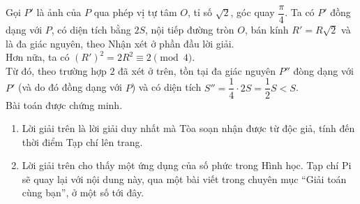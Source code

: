 \begin{bt}
{\begin{itemize}
			Gọi $P'$ là ảnh của $P$ qua phép vị tự tâm $O$, tỉ số $\sqrt{2}$, góc quay $\dfrac{\pi}{4}$. Ta có $P'$ đồng dạng với $P$, có diện tích bằng $2S$, nội tiếp đường tròn $O$, bán kính $R'=R\sqrt{2}$ và là đa giác nguyên, theo Nhận xét ở phần đầu lời giải.\\
			Hơn nữa, ta có $(R')^2=2R^2\equiv 2\pmod{4}$.\\
			Từ đó, theo trường hợp $2$ đã xét ở trên, tồn tại đa giác nguyên $P''$ đòng dạng với $P'$ (và do đó đồng dạng với $P$) và có diện tích $S''=\dfrac{1}{4}\cdot 2S=\dfrac{1}{2}S<S$.\\
			Bài toán được chứng minh.
		\end{itemize}
		\begin{nx}
			\hfill
			\begin{enumerate}[1.]
				\item Lời giải trên là lời giải duy nhất mà Tòa soạn nhận được từ độc giả, tính đến thời điểm Tạp chí lên trang.
				\item Lời giải trên cho thấy một ứng dụng của số phức trong Hình học. Tạp chí Pi sẽ quay lại với nội dung này, qua một bài viết trong chuyên mục ``Giải toán cùng bạn'', ở một số tới đây.
			\end{enumerate}
		\end{nx}
}
\end{bt}
